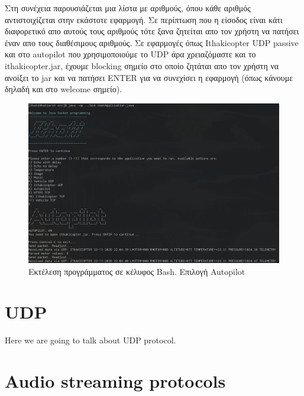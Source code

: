 \documentclass[hidelinks, 12pt, a4paper]{article}
\begin{document}
Στη συνέχεια παρουσιάζεται μια λίστα με αριθμούς, όπου κάθε αριθμός αντιστοιχίζεται στην εκάστοτε εφαρμογή. Σε περίπτωση που η είσοδος είναι κάτι διαφορετικό απο αυτούς τους αριθμούς τότε ξανα ζητείται απο τον χρήστη να πατήσει έναν απο τους διαθέσιμους αριθμούς. Σε εφαρμογές όπως Ithakicopter UDP passive και στο autopilot που χρησιμοποιούμε το UDP άρα χρειαζόμαστε και το ithakicopter.jar, έχουμε blocking σημείο στο οποίο ζητάται απο τον χρήστη να ανοίξει το jar και να πατήσει ENTER για να συνεχίσει η εφαρμογή (όπως κάνουμε δηλαδή και στο welcome σημείο).

\begin{figure}[h!]
\centering
	\includegraphics[height=.3\textheight, width=\textwidth]{assets/ui.png}
	\caption{Εκτέλεση προγράμματος σε κέλυφος Bash. Επιλογή Autopilot} 
    \label{fig:ui}
\end{figure}



\section{UDP}
Here we are going to talk about UDP protocol.



\section{Audio streaming protocols}




\clearpage



\end{document}
